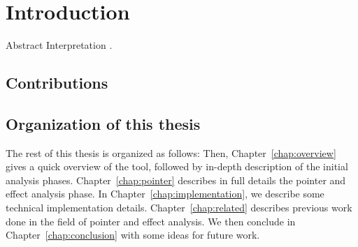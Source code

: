 \chapter{Introduction} \label{chap:intro}
%

Abstract Interpretation \cite{DBLP:conf/popl/CousotC77,DBLP:conf/popl/CousotC02}.

\section{Contributions}

\section{Organization of this thesis}
The rest of this thesis is organized as follows: Then,
Chapter~\ref{chap:overview} gives a quick overview of the tool, followed by
in-depth description of the initial analysis phases.
Chapter~\ref{chap:pointer} describes in full details the pointer and effect
analysis phase.  In Chapter~\ref{chap:implementation}, we describe some
technical implementation details. Chapter~\ref{chap:related} describes previous
work done in the field of pointer and effect analysis. We then conclude in
Chapter~\ref{chap:conclusion} with some ideas for future work.
